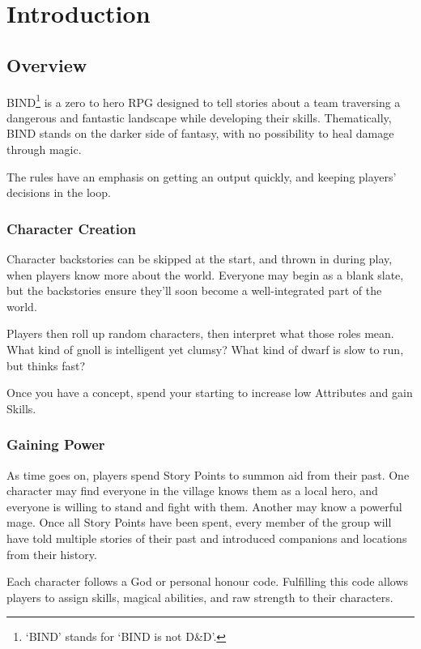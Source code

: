 \chapter*{Introduction}

\section*{Overview}

\begin{multicols}{2}

\noindent
BIND\footnote{`BIND' stands for `BIND is not D\&D'.} is a zero to hero RPG designed to tell stories about a team traversing a dangerous and fantastic landscape while developing their skills.
Thematically, BIND stands on the darker side of fantasy, with no possibility to heal damage through magic.

The rules have an emphasis on getting an output quickly, and keeping players' decisions in the loop.

\subsection*{Character Creation}

Character backstories can be skipped at the start, and thrown in during play, when players know more about the world.
Everyone may begin as a blank slate, but the backstories ensure they'll soon become a well-integrated part of the world.

Players then roll up random characters, then interpret what those roles mean.
What kind of gnoll is intelligent yet clumsy?
What kind of dwarf is slow to run, but thinks fast?

Once you have a concept, spend your starting  to increase low Attributes and gain Skills.

\subsection*{Gaining Power}

As time goes on, players spend Story Points to summon aid from their past.
One character may find everyone in the village knows them as a local hero, and everyone is willing to stand and fight with them.
Another may know a powerful mage.
Once all Story Points have been spent, every member of the group will have told multiple stories of their past and introduced companions and locations from their history.

Each character follows a God or personal honour code.
Fulfilling this code allows players to assign skills, magical abilities, and raw strength to their characters.


\end{multicols}
